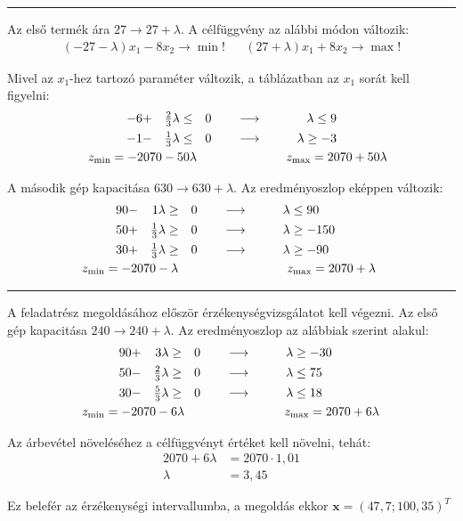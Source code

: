 \begin{megoldas}
\medskip\hrule\medskip

Az első termék ára $27 \longrightarrow 27+\lambda$. A célfüggvény az alábbi módon változik:
\begin{align*}
(-27-\lambda)x_1-8x_2\longrightarrow\min!&&
(27+\lambda)x_1+8x_2\longrightarrow\max!
\end{align*}

Mivel az $x_1$-hez tartozó paraméter változik, a táblázatban az $x_1$ sorát kell figyelni:
\begin{alignat*}{4}
-6&+&\tfrac{2}{3}\lambda&\leq&0&\qquad\longrightarrow\qquad&\lambda\leq9\\
-1&-&\tfrac{1}{3}\lambda&\leq&0&\qquad\longrightarrow\qquad&\lambda\geq-3\\
\mathclap{z_{\min}=-2070-50\lambda}&&&&&&
\mathclap{z_{\max}=2070+50\lambda}
\end{alignat*}

A második gép kapacitása $630 \longrightarrow 630+\lambda$. Az eredményoszlop eképpen változik:
\begin{alignat*}{5}
90&-&1\lambda&\geq&0&\qquad\longrightarrow\qquad&\lambda&\leq90\\
50&+&\tfrac{1}{3}\lambda&\geq&0&\qquad\longrightarrow\qquad&\lambda&\geq-150\\
30&+&\tfrac{1}{3}\lambda&\geq&0&\qquad\longrightarrow\qquad&\lambda&\geq-90\\
\mathclap{\hskip 0.1cm z_{\min}=-2070-\lambda}&&&&&&&&
\mathclap{\hskip -0.9cm z_{\max}=2070+\lambda}
\end{alignat*}\hrule\medskip

A feladatrész megoldásához először érzékenységvizsgálatot kell végezni. Az első gép kapacitása $240 \longrightarrow 240+\lambda$. Az eredményoszlop az alábbiak szerint alakul:
\begin{alignat*}{5}
90&+&3\lambda&\geq&0&\qquad\longrightarrow\qquad&\lambda&\geq-30\\
50&-&\tfrac{2}{3}\lambda&\geq&0&\qquad\longrightarrow\qquad&\lambda&\leq75\\
30&-&\tfrac{5}{3}\lambda&\geq&0&\qquad\longrightarrow\qquad&\lambda&\leq18\\
\mathclap{\hskip 0.1cm z_{\min}=-2070-6\lambda}&&&&&&&&
\mathclap{\hskip -0.7cm z_{\max}=2070+6\lambda}
\end{alignat*}

Az árbevétel növeléséhez a célfüggvényt értéket kell növelni, tehát:
\begin{align*}
2070+6\lambda&= 2070\cdot1,01\\
\lambda&=3,45
\end{align*}

Ez belefér az érzékenységi intervallumba, a megoldás ekkor $\mathbf{x}=(47,7;100,35)^T$
\end{megoldas}
